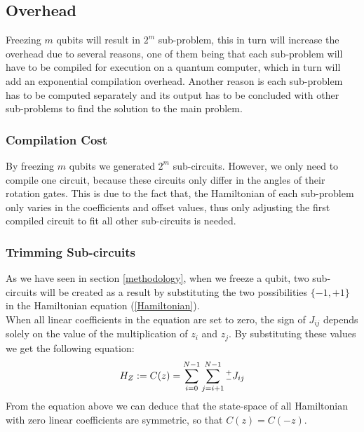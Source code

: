 \subsection{Overhead}\label{overhead}
Freezing $m$ qubits will result in $2^m$ sub-problem, this in turn will increase the overhead due to several reasons, one of them being that each sub-problem will have to be compiled for execution on a quantum computer, which in turn will add an exponential compilation overhead. Another reason is each sub-problem has to be computed separately and its output has to be concluded with other sub-problems to find the solution to the main problem.
\subsubsection{Compilation Cost}\label{cost}
By freezing $m$ qubits we generated $2^m$ sub-circuits. However, we only need to compile one circuit, because these circuits only differ in the angles of their rotation gates. This is due to the fact that, the Hamiltonian of each sub-problem only varies in the coefficients and offset values, thus only adjusting the first compiled circuit to fit all other sub-circuits is needed.
\subsubsection{Trimming Sub-circuits}
As we have seen in section \ref{methodology}, when we freeze a qubit, two sub-circuits will be created as a result by substituting the two possibilities $\{-1, +1\}$ in the Hamiltonian equation (\ref{Hamiltonian}).\\
When all linear coefficients in the equation are set to zero, the sign of $J_{ij}$ depends solely on the value of the multiplication of $z_i$ and $z_j$. By substituting these values we get the following equation:
\begin{equation}
    H_Z := C(z) = \sum^{N-1}_{i=0}\sum^{N-1}_{j=i+1}\smash{{}^+_-}J_{ij}
\end{equation}
From the equation above we can deduce that the state-space of all Hamiltonian with zero linear coefficients are symmetric, so that $C(z) = C(-z)$.
